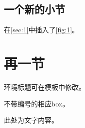 \documentclass[]{templateWYC}
\begin{document}
		\subsection{一个新的小节}
		在\cref{sec:1}中插入了\cref{fig:1}。

	\section{再一节}

		\begin{prob}[一种box示例]
			环境标题可在模板中修改。
		\end{prob}
		\begin{prob*}
            不带编号的相应box。
        \end{prob*}

		\begin{notice}[另一种box示例]
			此处为文字内容。
		\end{notice}
\end{document}

